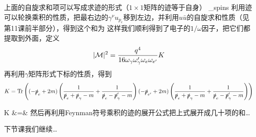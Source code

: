 \documentclass[CJK]{beamer}
\begin{document}
\begin{frame}
\bch
上面的自旋求和项可以写成求迹的形式（$1\times 1$矩阵的迹等于自身）
{\tiny
\be
\sum_{\rm spins}  
\ee
}
利用迹可以轮换乘积的性质，把最右边的$\gamma^\nu u_{p_e}$移到左边，并利用$u\bar{u}$的自旋求和性质（见第11课前半部分），得到这个和为
{\tiny
\bea
\eea
}
这样我们顺利得到了电子的$1/\omega$因子，把它们都提取到外面，定义
{\scriptsize 
$$|{\mathcal{M}}|^2 = \frac{q^4}{16 \omega_\gamma\omega_\gamma'\omega_e\omega_{e'}} K$$}
再利用$\gamma$矩阵形式下标的性质，得到
{\tiny
$$K =  \mathrm{Tr}\left((-\slashed{p}_e+2m) \left(\frac{1}{\slashed{p}_e+\slashed{p}_\gamma-m}+\frac{1}{\slashed{p}_e-\slashed{p}_\gamma'-m}\right)(-\slashed{p}_{e'}+2m)\left(\frac{1}{\slashed{p}_e+\slashed{p}_\gamma-m}+\frac{1}{\slashed{p}_e-\slashed{p}_\gamma'-m}\right)\right)$$
}

\ech
\end{frame}

\begin{frame}
\bch
{\scriptsize
\bea
K &=&  \trace{}
\eea
}
然后再利用Feynman符号乘积的迹的展开公式把上式展开成几十项的和…
\ech
\end{frame}

\begin{frame}
\bch
下节课我们继续…
\ech
\end{frame}
\end{document}
